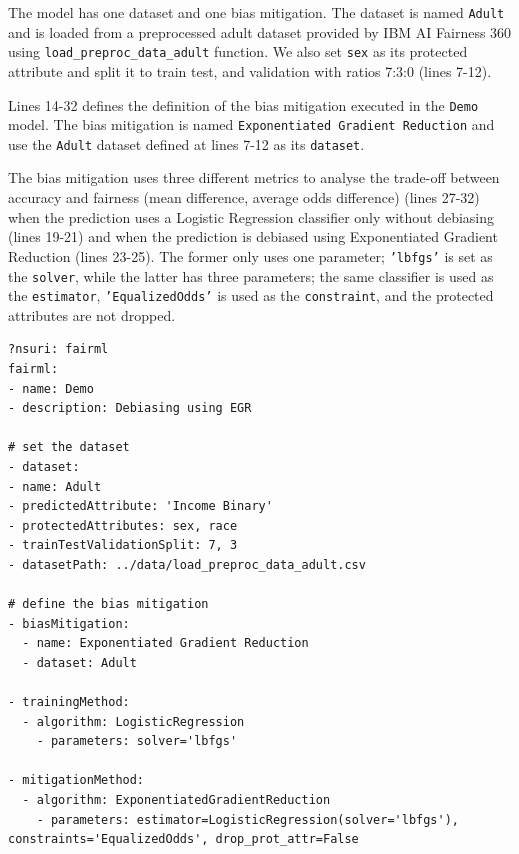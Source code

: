 \documentclass[sigconf,review]{acmart}
\begin{document}
{	The model has one dataset and one bias mitigation. The dataset is named \texttt{Adult} and is loaded from a preprocessed adult dataset provided by IBM AI Fairness 360 using \texttt{load\_preproc\_data\_adult} function. We also set \texttt{sex} as its protected attribute and split it to train test, and validation with ratios 7:3:0 (lines 7-12). 
	
	Lines 14-32 defines the definition of the bias mitigation executed in the \texttt{Demo} model. The bias mitigation is named \texttt{Exponentiated Gradient Reduction} and use the \texttt{Adult} dataset defined at lines 7-12 as its \texttt{dataset}. 
	
	The bias mitigation uses three different metrics to analyse the trade-off between accuracy and fairness (mean difference, average odds difference) (lines 27-32) when the prediction uses a Logistic Regression classifier only without debiasing (lines 19-21) and when the prediction is debiased using Exponentiated Gradient Reduction (lines 23-25). The former only uses one parameter; \texttt{'lbfgs'} is set as the \texttt{solver}, while the latter has three parameters; the same classifier is used as the \texttt{estimator}, \texttt{'EqualizedOdds'} is used as the \texttt{constraint}, and the protected attributes are not dropped.
	
\begin{lstlisting}[firstnumber=1,style=yaml,caption={Bias mitigation using  Demo Exponentiated Gradient Reduction  expressed in YAML.},label=lst:fairml_model]
?nsuri: fairml
fairml:
- name: Demo
- description: Debiasing using EGR

# set the dataset
- dataset:
- name: Adult
- predictedAttribute: 'Income Binary'
- protectedAttributes: sex, race
- trainTestValidationSplit: 7, 3
- datasetPath: ../data/load_preproc_data_adult.csv

# define the bias mitigation
- biasMitigation:
  - name: Exponentiated Gradient Reduction  
  - dataset: Adult

- trainingMethod:
  - algorithm: LogisticRegression
    - parameters: solver='lbfgs'

- mitigationMethod:
  - algorithm: ExponentiatedGradientReduction
    - parameters: estimator=LogisticRegression(solver='lbfgs'), constraints='EqualizedOdds', drop_prot_attr=False


\end{lstlisting}}
\end{document}
